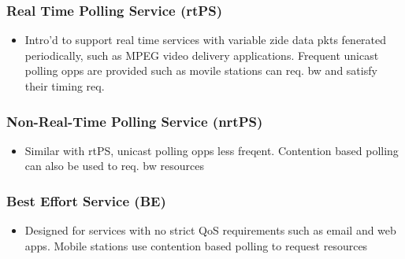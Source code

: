 \documentclass[a4paper]{article}
\begin{document}
\subsubsection{Real Time Polling Service (rtPS)}
\begin{itemize}
	\item Intro'd to support real time services with variable zide data pkts
		fenerated periodically, such as MPEG video delivery
		applications. Frequent unicast polling opps are provided such as
		movile stations can req. bw and satisfy their timing req.
\end{itemize}
\subsubsection{Non-Real-Time Polling Service (nrtPS)}
\begin{itemize}
	\item Similar with rtPS, unicast polling opps less freqent. Contention
		based polling can also be used to req. bw resources
\end{itemize}
\subsubsection{Best Effort Service (BE)}
\begin{itemize}
	\item Designed for services with no strict QoS requirements such as
		email and web apps. Mobile stations use contention based polling
		to request resources
\end{itemize}
\end{document}
